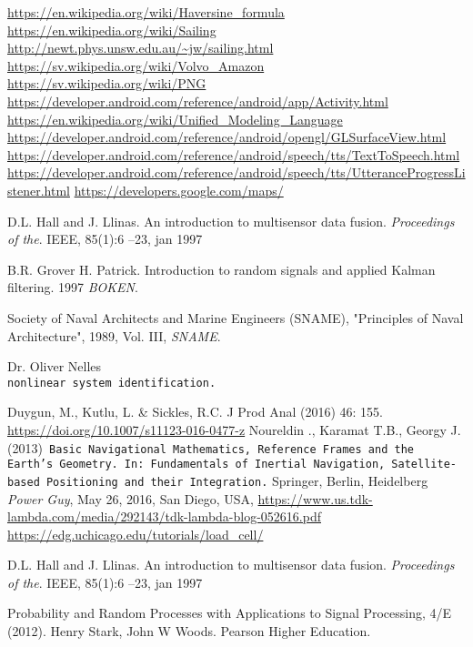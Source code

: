 \begin{thebibliography}{9}
  \url{https://en.wikipedia.org/wiki/Haversine_formula}
  \url{https://en.wikipedia.org/wiki/Sailing}
  \url{http://newt.phys.unsw.edu.au/~jw/sailing.html}
  \url{https://sv.wikipedia.org/wiki/Volvo_Amazon}
  \url{https://sv.wikipedia.org/wiki/PNG}
  \url{https://developer.android.com/reference/android/app/Activity.html}
  \url{https://en.wikipedia.org/wiki/Unified_Modeling_Language}
  \url{https://developer.android.com/reference/android/opengl/GLSurfaceView.html}
  \url{https://developer.android.com/reference/android/speech/tts/TextToSpeech.html}
  \url{https://developer.android.com/reference/android/speech/tts/UtteranceProgressListener.html}
  \url{https://developers.google.com/maps/}

D.L. Hall and J. Llinas. An introduction to multisensor data fusion. 
\textit{Proceedings of the}. IEEE, 85(1):6 –23, jan 1997

B.R. Grover H. Patrick. Introduction to random signals and applied Kalman filtering. 1997
\textit{BOKEN}. 

Society of Naval Architects and Marine Engineers (SNAME), "Principles of Naval Architecture", 1989, Vol. III,
\textit{SNAME}. 

 
Dr. Oliver Nelles
\\\texttt{nonlinear system identification.}

Duygun, M., Kutlu, L. \& Sickles, R.C. J Prod Anal (2016) 46: 155. \url{https://doi.org/10.1007/s11123-016-0477-z}
Noureldin ., Karamat T.B., Georgy J. (2013)\texttt{ Basic Navigational Mathematics, Reference Frames and the Earth’s Geometry. In: Fundamentals of Inertial Navigation, Satellite-based Positioning and their Integration.} Springer, Berlin, Heidelberg
\emph{Power Guy}, May 26, 2016, San Diego, USA,
  \url{https://www.us.tdk-lambda.com/media/292143/tdk-lambda-blog-052616.pdf}
  \url{https://edg.uchicago.edu/tutorials/load_cell/}

D.L. Hall and J. Llinas. An introduction to multisensor data fusion. 
\textit{Proceedings of
the}. IEEE, 85(1):6 –23, jan 1997

Probability and Random Processes with Applications to Signal Processing, 4/E (2012). 
Henry Stark, John W Woods. Pearson Higher Education. 


\end{thebibliography}
